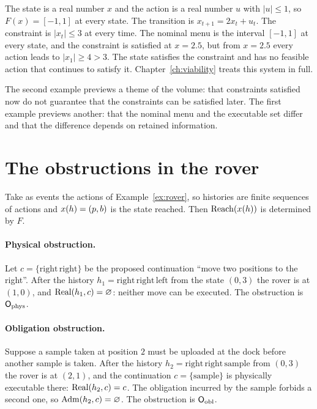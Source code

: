 \begin{example}\label{ex:scalar}
The state is a real number $x$ and the action is a real number $u$ with $|u|\le1$, so $F(x)=[-1,1]$ at every state. The transition is $x_{t+1}=2x_t+u_t$. The constraint is $|x_t|\le3$ at every time. The nominal menu is the interval $[-1,1]$ at every state, and the constraint is satisfied at $x=2.5$, but from $x=2.5$ every action leads to $|x_1|\ge4>3$. The state satisfies the constraint and has no feasible action that continues to satisfy it. Chapter~\ref{ch:viability} treats this system in full.
\end{example}

The second example previews a theme of the volume: that constraints satisfied now do not guarantee that the constraints can be satisfied later. The first example previews another: that the nominal menu and the executable set differ and that the difference depends on retained information.



\section{The obstructions in the rover}\label{sec:obstructions-rover}

Take as events the actions of Example~\ref{ex:rover}, so histories are finite sequences of actions and $x(h)=(p,b)$ is the state reached. Then $\operatorname{Reach}(x(h))$ is determined by $F$.

\paragraph{Physical obstruction.} Let $c=\{\mathrm{right}\,\mathrm{right}\}$ be the proposed continuation ``move two positions to the right''. After the history $h_1=\mathrm{right}\,\mathrm{right}\,\mathrm{left}$ from the state $(0,3)$ the rover is at $(1,0)$, and $\operatorname{Real}(h_1,c)=\varnothing$: neither move can be executed. The obstruction is $\mathsf{O}_{\mathrm{phys}}$.

\paragraph{Obligation obstruction.} Suppose a sample taken at position $2$ must be uploaded at the dock before another sample is taken. After the history $h_2=\mathrm{right}\,\mathrm{right}\,\mathrm{sample}$ from $(0,3)$ the rover is at $(2,1)$, and the continuation $c=\{\mathrm{sample}\}$ is physically executable there: $\operatorname{Real}(h_2,c)=c$. The obligation incurred by the sample forbids a second one, so $\operatorname{Adm}(h_2,c)=\varnothing$. The obstruction is $\mathsf{O}_{\mathrm{obl}}$.

